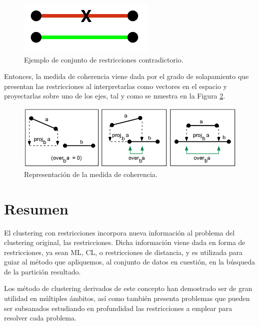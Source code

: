 \begin{figure}[!h]
	\centering
	\includegraphics[scale=0.4]{imagenes/c3/Coherencia/Coher1}
	\caption[Ejemplo de conjunto de restricciones contradictorio.]{Ejemplo de conjunto de restricciones contradictorio. \cite{Survey:2007}}\label{fig:figure17}
\end{figure}

Entonces, la medida de coherencia viene dada por el grado de solapamiento que presentan las restricciones al interpretarlas como vectores en el espacio y proyectarlas sobre uno de los ejes, tal y como se muestra en la Figura \ref{fig:figure18}.

\begin{figure}[!h]
	\centering
	\includegraphics[scale=0.4]{imagenes/c3/Coherencia/Coher2}
	\caption[Representación de la medida de coherencia.]{Representación de la medida de coherencia. \cite{Survey:2007}}\label{fig:figure18}
\end{figure}

\section{Resumen}

El clustering con restricciones incorpora nueva información al problema del clustering original, las restricciones. Dicha información viene dada en forma de restricciones, ya sean \acf{ML}, \acf{CL}, o restricciones de distancia, y es utilizada para guiar al método que apliquemos, al conjunto de datos en cuestión, en la búsqueda de la partición resultado.

Los método de clustering derivados de este concepto han demostrado ser de gran utilidad en múltiples ámbitos, así como también presenta problemas que pueden ser subsanados estudiando en profundidad las restricciones a emplear para resolver cada problema.


































